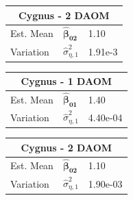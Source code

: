 \documentclass[landscape,a0paper,fontscale=0.285]{baposter} %
\newcommand{\vect}[1]{\boldsymbol{#1}}
\begin{document}
\begin{poster}
{\begin{multicols}{3}
\begin{center}
{\vspace{1em}
\begin{tabular}{|l|l|l|}
\hline
\multicolumn{3}{|c|}{Cygnus - 2 DAOM}\\
    \hline
   Est. Mean & $\vect{\widehat\beta_{02}}$   & 1.10     \\\hline
    Variation       & $\widehat{\sigma}_{\eta,1}^2$ & 1.91e-3  \\\hline
\end{tabular}
}

{\small
\renewcommand{\arraystretch}{1.2}
\begin{tabular}{|l|l|l|}
\hline
\multicolumn{3}{|c|}{Cygnus - 1 DAOM}\\
    \hline
   Est. Mean & $\vect{\widehat\beta_{01}}$   &1.40 \\\hline
    Variation       & $\widehat{\sigma}_{\eta,1}^2$ &4.40e-04 \\\hline
\end{tabular}

\vspace{1em}
\begin{tabular}{|l|l|l|}
\hline
\multicolumn{3}{|c|}{Cygnus - 2 DAOM}\\
    \hline
   Est. Mean & $\vect{\widehat\beta_{02}}$   &1.10 \\\hline
    Variation       & $\widehat{\sigma}_{\eta,1}^2$ & 1.90e-03    \\\hline
\end{tabular}
}
\end{center}
\end{multicols}
}


\end{poster}
\end{document}
